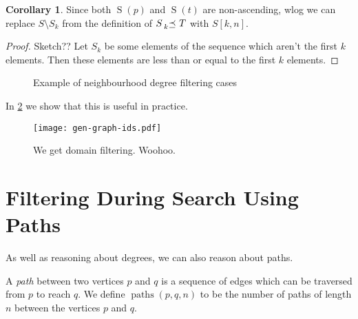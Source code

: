 \documentclass[letterpaper]{article}
\theoremstyle{definition}
\newtheorem{corollary}{Corollary}
\newcommand{\paths}{\operatorname{paths}}
\newcommand{\lesspreceq}[1]{\prescript{}{#1}{\preceq}\ }
\newcommand{\nds}{\operatorname{S}}
\newcommand{\todo}[1]{{\color{red} {[}{#1}{]}}}
\begin{document}
\begin{corollary}
Since both $\nds(p)$ and $\nds(t)$ are non-ascending, wlog we can replace $S \setminus S_k$ from the definition of $S \lesspreceq{k}
T$ with $S[k, n]$.
\end{corollary}

\begin{proof}
Sketch?? Let $S_k$ be some elements of the sequence which aren't the first $k$ elements.  Then these elements are less than or equal to the first $k$ elements.
\end{proof}


\begin{figure}
    \begin{center}
        \caption{Example of neighbourhood degree filtering cases}
        \label{fig:nds}
    \end{center}
\end{figure}


In \cref{figure:ids} we show that this is useful in practice.

\begin{figure}
    \texttt{[image: gen-graph-ids.pdf]}
    \caption{We get domain filtering. Woohoo.}\label{figure:ids}
\end{figure}

\section{Filtering During Search Using Paths}

As well as reasoning about degrees, we can also reason about paths.

A \emph{path} between two vertices $p$ and $q$ is a sequence of edges which can be traversed from $p$ to reach $q$. We define $\paths(p,q,n)$ to be the number of paths of length $n$ between the vertices $p$ and $q$.
\end{document}
